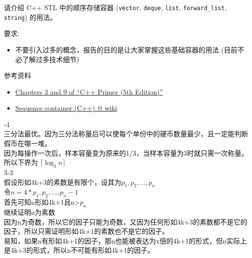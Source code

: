 \documentclass[a4paper, justified]{tufte-handout}
\begin{document}
\vspace{0.50cm}
\begin{ot}
  请介绍 C++ STL 中的顺序存储容器
  (\texttt{vector}, \texttt{deque}, \texttt{list}, \texttt{forward\_list}, \texttt{string}) 的用法。

  \noindent 要求:
  \begin{itemize}
    \item 不要引入过多的概念，报告的目的是让大家掌握这些基础容器的用法 (目前不必了解过多技术细节)
  \end{itemize}

  \noindent 参考资料
  \begin{itemize}
    \item \href{http://ptgmedia.pearsoncmg.com/images/9780321714114/samplepages/0321714113.pdf}{Chapters 3 and 9 of ``C++ Primer (5th Edition)''}
    \item \href{https://en.wikipedia.org/wiki/Sequence\_container\_(C\%2B\%2B)}{Sequence container (C++) @ wiki}
  \end{itemize}
\end{ot}



-4\\
三分法最优。因为三分法称量后可以使每个单份中的硬币数量最少，且一定能判断假币在哪一堆。\\
因为每操作一次后，样本容量变为原来的1/3，当样本容量为3时就只需一次称量。所以下界为  $\lceil \log_3 n \rceil$\\
3-3\\
假设形如4k+3的素数是有限个，设其为$p_1, p_2,...,p_n$\\
令$n = 4 * p_1, p_2,...,p_n - 1$\\
首先可知n形如4k+1且n>$p_n$\\
继续证明n为素数\\
因为n为奇数，所以它的因子只能为奇数，又因为任何形如4k+3的素数都不是它的因子，所以只需证明形如4k+1的素数也不是它的因子。\\
易知，如果n有形如4k+1的因子，那n也能被表达为x倍的4k+1的形式，但n实际上是4k+3的形式，所以n不可能有形如4k+1的因子。\\


\beginfb

\end{document}
